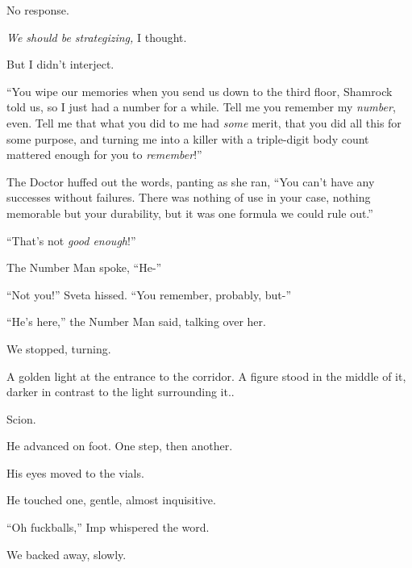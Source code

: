 No response.



\emph{We should be strategizing,} I thought.



But I didn't interject.



``You wipe our memories when you send us down to the third floor, Shamrock told us, so I just had a number for a while.  Tell me you remember my \emph{number}, even.  Tell me that what you did to me had \emph{some} merit, that you did all this for some purpose, and turning me into a killer with a triple-digit body count mattered enough for you to \emph{remember}!''



The Doctor huffed out the words, panting as she ran, ``You can't have any successes without failures.  There was nothing of use in your case, nothing memorable but your durability, but it was one formula we could rule out.''



``That's not \emph{good enough}!''



The Number Man spoke, ``He-''



``Not you!'' Sveta hissed.  ``You remember, probably, but-''



``He's here,'' the Number Man said, talking over her.



We stopped, turning.



A golden light at the entrance to the corridor.  A figure stood in the middle of it, darker in contrast to the light surrounding it..



Scion.



He advanced on foot.  One step, then another.



His eyes moved to the vials.



He touched one, gentle, almost inquisitive.



``Oh fuckballs,'' Imp whispered the word.



We backed away, slowly.



